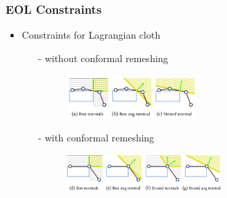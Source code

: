 \documentclass[serif,mathserif, 12pt]{beamer}
\begin{document}
\begin{frame}
  \frametitle{EOL Constraints}
  \begin{itemize}
  \item Constraints for Lagrangian cloth
    \begin{itemize}
    \item[-] without conformal remeshing
      \begin{figure}
        \centering
        \includegraphics[width=0.5\textwidth]{img/non_conf_lag_cons}
      \end{figure}
    \item[-] with conformal remeshing
      \begin{figure}
        \centering
        \includegraphics[width=0.6\textwidth]{img/conf_lag_cons}
      \end{figure}
    \end{itemize}
  \end{itemize}
\end{frame}
\end{document}
